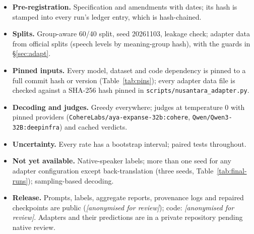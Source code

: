 \documentclass[11pt]{article}
\newif\ifcameraready
\newcommand{\anon}[1]{\ifcameraready #1\else\textit{[anonymised for review]}\fi}
\begin{document}
\begin{itemize}\setlength{\itemsep}{1pt}\raggedright
\item \textbf{Pre-registration.} Specification and amendments with dates; its hash is stamped into every run's
  ledger entry, which is hash-chained.
\item \textbf{Splits.} Group-aware 60/40 split, seed 20261103, leakage check; adapter data from official splits
  (speech levels by meaning-group hash), with the guards in \S\ref{sec:adapt}.
\item \textbf{Pinned inputs.} Every model, dataset and code dependency is pinned to a full commit hash or version
  (Table~\ref{tab:pins}); every adapter data file is checked against a SHA-256 hash pinned in \texttt{scripts/nusantara\_adapter.py}.
\item \textbf{Decoding and judges.} Greedy everywhere; judges at temperature 0 with pinned providers
  (\texttt{CohereLabs/aya-expanse-32b:cohere}, \texttt{Qwen/Qwen3-32B:deepinfra}) and cached verdicts.
\item \textbf{Uncertainty.} Every rate has a bootstrap interval; paired tests throughout.
\item \textbf{Not yet available.} Native-speaker labels; more than one seed for any adapter configuration except
  back-translation (three seeds, Table~\ref{tab:final-runs}); sampling-based decoding.
\item \textbf{Release.} Prompts, labels, aggregate reports, provenance logs and repaired checkpoints are public
  (\anon{\url{https://huggingface.co/collections/HydraOfMalice/same-model-different-language-repair-checkpoints-6af426d1cac578d29e4805e5}});
  code: \anon{\url{https://github.com/Hydra-Of-Malice/same-model-different-language}}. Adapters and their
  predictions are in a private repository pending native review.
\end{itemize}
\end{document}
